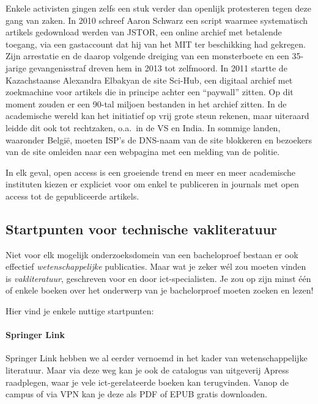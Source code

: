 Enkele activisten gingen zelfs een stuk verder dan openlijk protesteren tegen deze gang van zaken. In 2010 schreef Aaron Schwarz een script waarmee systematisch artikels gedownload werden van JSTOR, een online archief met betalende toegang, via een gastaccount dat hij van het MIT ter beschikking had gekregen. Zijn arrestatie en de daarop volgende dreiging van een monsterboete en een 35-jarige gevangenisstraf dreven hem in 2013 tot zelfmoord. In 2011 startte de Kazachstaanse Alexandra Elbakyan de site Sci-Hub, een digitaal archief met zoekmachine voor artikels die in principe achter een ``paywall'' zitten. Op dit moment zouden er een 90-tal miljoen bestanden in het archief zitten. In de academische wereld kan het initiatief op vrij grote steun rekenen, maar uiteraard leidde dit ook tot rechtzaken, o.a.\ in de VS en India. In sommige landen, waaronder België, moeten ISP's de DNS-naam van de site blokkeren en bezoekers van de site omleiden naar een webpagina met een melding van de politie.

In elk geval, open access is een groeiende trend en meer en meer academische instituten kiezen er expliciet voor om enkel te publiceren in journals met open access tot de gepubliceerde artikels.

\subsection{Startpunten voor technische vakliteratuur}%
\label{ssec:technische-vakliteratuur}

Niet voor elk mogelijk onderzoeksdomein van een bacheloproef bestaan er ook effectief \textit{wetenschappelijke} publicaties. Maar wat je zeker wél zou moeten vinden is \textit{vakliteratuur}, geschreven voor en door ict-specialisten. Je zou op zijn minst één of enkele boeken over het onderwerp van je bachelorproef moeten zoeken en lezen!

Hier vind je enkele nuttige startpunten:

\paragraph{Springer Link}

Springer Link hebben we al eerder vernoemd in het kader van wetenschappelijke literatuur. Maar via deze weg kan je ook de catalogus van uitgeverij Apress raadplegen, waar je vele ict-gerelateerde boeken kan terugvinden. Vanop de campus of via VPN kan je deze als PDF of EPUB gratis downloaden.

